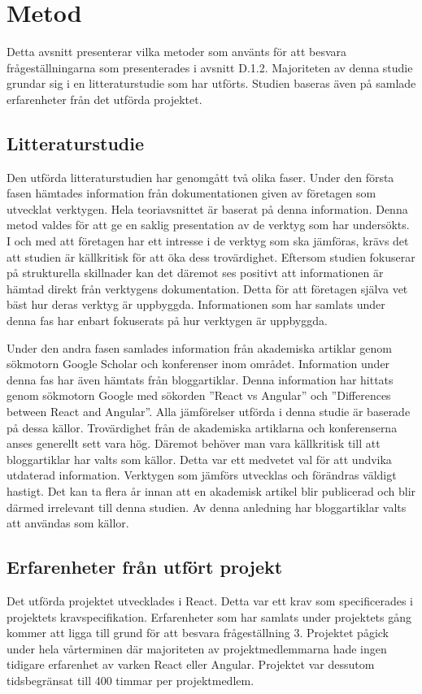 \section{Metod}
\label{sec:axel-method}

Detta avsnitt presenterar vilka metoder som använts för att besvara frågeställningarna som presenterades i avsnitt D.1.2. Majoriteten av denna studie grundar sig i en litteraturstudie som har utförts. Studien baseras även på samlade erfarenheter från det utförda projektet.

\subsection{Litteraturstudie}
Den utförda litteraturstudien har genomgått två olika faser. Under den första fasen hämtades information från dokumentationen given av företagen som utvecklat verktygen. Hela teoriavsnittet är baserat på denna information. Denna metod valdes för att ge en saklig presentation av de verktyg som har undersökts. I och med att företagen har ett intresse i de verktyg som ska jämföras, krävs det att studien är källkritisk för att öka dess trovärdighet. Eftersom studien fokuserar på strukturella skillnader kan det däremot ses positivt att informationen är hämtad direkt från verktygens dokumentation. Detta för att företagen själva vet bäst hur deras verktyg är uppbyggda. Informationen som har samlats under denna fas har enbart fokuserats på hur verktygen är uppbyggda. 

Under den andra fasen samlades information från akademiska artiklar genom sökmotorn Google Scholar och konferenser inom området. Information under denna fas har även hämtats från bloggartiklar. Denna information har hittats genom sökmotorn Google med sökorden ''React vs Angular'' och ''Differences between React and Angular''. Alla jämförelser utförda i denna studie är baserade på dessa källor. Trovärdighet från de akademiska artiklarna och konferenserna anses generellt sett vara hög. Däremot behöver man vara källkritisk till att bloggartiklar har valts som källor. Detta var ett medvetet val för att undvika utdaterad information. Verktygen som jämförs utvecklas och förändras väldigt hastigt. Det kan ta flera år innan att en akademisk artikel blir publicerad och blir därmed irrelevant till denna studien. Av denna anledning har bloggartiklar valts att användas som källor.

\subsection{Erfarenheter från utfört projekt}
Det utförda projektet utvecklades i React. Detta var ett krav som specificerades i projektets kravspecifikation. Erfarenheter som har samlats under projektets gång kommer att ligga till grund för att besvara frågeställning 3. Projektet pågick under hela vårterminen där majoriteten av projektmedlemmarna hade ingen tidigare erfarenhet av varken React eller Angular. Projektet var dessutom tidsbegränsat till 400 timmar per projektmedlem. 

